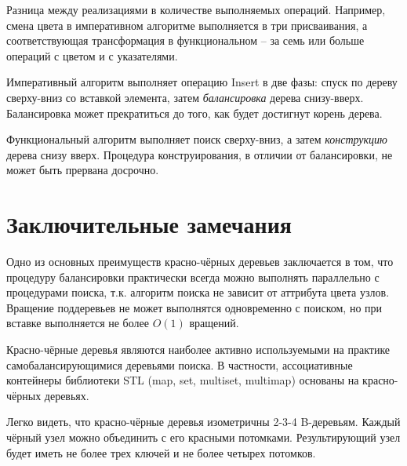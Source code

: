\documentclass[11pt]{article}
\begin{document}
Разница между реализациями в количестве выполняемых операций. Например, смена цвета в императивном алгоритме выполняется в три присваивания, а соответствующая трансформация в функциональном -- за семь или больше операций с цветом и с указателями.

Императивный алгоритм выполняет операцию Insert в две фазы: спуск по дереву сверху-вниз со вставкой элемента, затем \emph{балансировка} дерева снизу-вверх. Балансировка может прекратиться до того, как будет достигнут корень дерева.

Функциональный алгоритм выполняет поиск сверху-вниз, а затем \emph{конструкцию} дерева снизу вверх. Процедура конструирования, в отличии от балансировки, не может быть прервана досрочно.

\section{Заключительные замечания}
Одно из основных преимуществ красно-чёрных деревьев заключается в том, что процедуру балансировки практически всегда можно выполнять параллельно с процедурами поиска, т.к. алгоритм поиска не зависит от аттрибута цвета узлов. Вращение поддеревьев не может выполнятся одновременно с поиском, но при вставке выполняется не более $O(1)$ вращений.

Красно-чёрные деревья являются наиболее активно используемыми на практике самобалансирующимися деревьями поиска. В частности, ассоциативные контейнеры библиотеки STL (map, set, multiset, multimap) основаны на красно-чёрных деревьях.

Легко видеть, что красно-чёрные деревья изометричны 2-3-4 B-деревьям. Каждый чёрный узел можно объединить с его красными потомками. Результирующий узел будет иметь не более трех ключей и не более четырех потомков.



\end{document}
